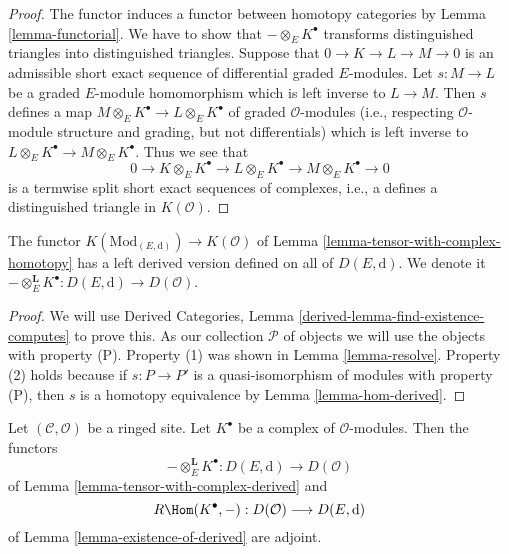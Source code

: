 \begin{proof}
The functor induces a functor between homotopy categories by
Lemma \ref{lemma-functorial}.
We have to show that $- \otimes_E K^\bullet$ transforms distinguished
triangles into distinguished triangles.
Suppose that $0 \to K \to L \to M \to 0$ is an admissible short
exact sequence of differential graded $E$-modules. Let $s : M \to L$ be
a graded $E$-module homomorphism which is left inverse to $L \to M$.
Then $s$ defines a map $M \otimes_E K^\bullet \to L \otimes_E K^\bullet$
of graded $\mathcal{O}$-modules (i.e., respecting $\mathcal{O}$-module
structure and grading, but not differentials)
which is left inverse to $L \otimes_E K^\bullet \to M \otimes_E K^\bullet$.
Thus we see that
$$
0 \to K \otimes_E K^\bullet \to L \otimes_E K^\bullet \to
M \otimes_E K^\bullet \to 0
$$
is a termwise split short exact sequences of complexes, i.e., a
defines a distinguished triangle in $K(\mathcal{O})$.
\end{proof}

\begin{lemma}
\label{lemma-tensor-with-complex-derived}
The functor $K(\text{Mod}_{(E, \text{d})}) \to K(\mathcal{O})$
of Lemma \ref{lemma-tensor-with-complex-homotopy} has a left derived
version defined on all of $D(E, \text{d})$. We denote it
$- \otimes_E^\mathbf{L} K^\bullet : D(E, \text{d}) \to D(\mathcal{O})$.
\end{lemma}

\begin{proof}
We will use
Derived Categories, Lemma \ref{derived-lemma-find-existence-computes}
to prove this. As our collection $\mathcal{P}$
of objects we will use the objects with property (P).
Property (1) was shown in Lemma \ref{lemma-resolve}.
Property (2) holds because if $s : P \to P'$ is a quasi-isomorphism
of modules with property (P), then $s$ is a homotopy equivalence
by Lemma \ref{lemma-hom-derived}.
\end{proof}

\begin{lemma}
\label{lemma-tensor-with-complex-hom-adjoint}
Let $(\mathcal{C}, \mathcal{O})$ be a ringed site.
Let $K^\bullet$ be a complex of $\mathcal{O}$-modules.
Then the functors
$$
- \otimes_E^\mathbf{L} K^\bullet :
D(E, \text{d})
\longrightarrow
D(\mathcal{O})
$$
of Lemma \ref{lemma-tensor-with-complex-derived} and
$$
R\Hom(K^\bullet, -) : D(\mathcal{O}) \longrightarrow D(E, \text{d})
$$
of Lemma \ref{lemma-existence-of-derived} are adjoint.
\end{lemma}

